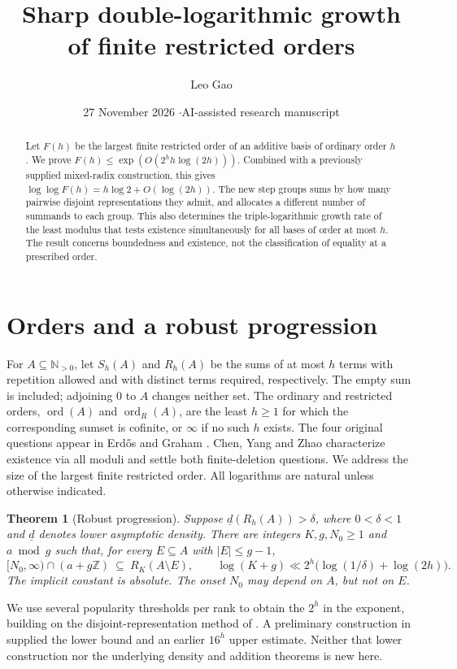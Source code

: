 \documentclass[11pt]{article}
\title{Sharp double-logarithmic growth\protect\\ of finite restricted orders}
\author{Leo Gao}
\date{27 November 2026 \enspace$\cdot$\enspace AI-assisted research manuscript}
\newtheorem{theorem}{Theorem}
\newcommand{\N}{\mathbb N}
\newcommand{\Z}{\mathbb Z}
\newcommand{\lowd}{\underline{d}}
\newcommand{\ord}{\operatorname{ord}}
\newcommand{\ordR}{\operatorname{ord}_{R}}
\begin{document}
\maketitle
\begin{abstract}
Let $F(h)$ be the largest finite restricted order of an additive basis of ordinary order $h$. We prove $F(h)\le \exp(O(2^h h\log(2h)))$. Combined with a previously supplied mixed-radix construction, this gives $\log\log F(h)=h\log 2+O(\log(2h))$. The new step groups sums by how many pairwise disjoint representations they admit, and allocates a different number of summands to each group. This also determines the triple-logarithmic growth rate of the least modulus that tests existence simultaneously for all bases of order at most $h$. The result concerns boundedness and existence, not the classification of equality at a prescribed order.
\end{abstract}
\section{Orders and a robust progression}
For $A\subseteq\N_{>0}$, let $S_h(A)$ and $R_h(A)$ be the sums of at most $h$ terms with repetition allowed and with distinct terms required, respectively. The empty sum is included; adjoining $0$ to $A$ changes neither set. The ordinary and restricted orders, $\ord(A)$ and $\ordR(A)$, are the least $h\ge1$ for which the corresponding sumset is cofinite, or $\infty$ if no such $h$ exists. The four original questions appear in Erdős and Graham \cite[p.~206, remark~3]{EG}. Chen, Yang and Zhao \cite{CYZ} characterize existence via all moduli and settle both finite-deletion questions. We address the size of the largest finite restricted order. All logarithms are natural unless otherwise indicated.

\begin{theorem}[Robust progression]\label{thm:main}
Suppose $\lowd(R_h(A))>\delta$, where $0<\delta<1$ and $\lowd$ denotes lower asymptotic density. There are integers $K,g,N_0\ge1$ and $a\bmod g$ such that, for every $E\subseteq A$ with $|E|\le g-1$,
\[
 [N_0,\infty)\cap(a+g\Z)\ \subseteq\ R_K(A\setminus E),\qquad
 \log(K+g)\ll 2^h\bigl(\log(1/\delta)+\log(2h)\bigr).
\]
The implicit constant is absolute. The onset $N_0$ may depend on $A$, but not on $E$.
\end{theorem}

We use several popularity thresholds per rank to obtain the $2^h$ in the exponent, building on the disjoint-representation method of \cite[Lemmas~3--4]{CYZ}. A preliminary construction in \cite{Gao} supplied the lower bound and an earlier $16^h$ upper estimate. Neither that lower construction nor the underlying density and addition theorems is new here.
\end{document}
